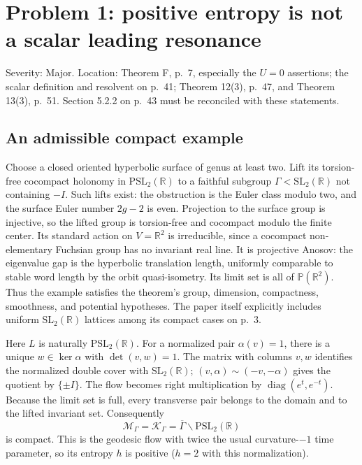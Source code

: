 \documentclass[10pt]{article}
\begin{document}
\section*{Problem 1: positive entropy is not a scalar leading resonance}
Severity: Major. Location: Theorem F, p. 7, especially the \(U=0\) assertions; the scalar definition and resolvent on p. 41; Theorem 12(3), p. 47, and Theorem 13(3), p. 51. Section 5.2.2 on p. 43 must be reconciled with these statements.\par
\subsection*{An admissible compact example}
Choose a closed oriented hyperbolic surface of genus at least two. Lift its torsion-free cocompact holonomy in \(\mathrm{PSL}_2(\mathbb R)\) to a faithful subgroup \(\Gamma<\mathrm{SL}_2(\mathbb R)\) not containing \(-I\). Such lifts exist: the obstruction is the Euler class modulo two, and the surface Euler number \(2g-2\) is even. Projection to the surface group is injective, so the lifted group is torsion-free and cocompact modulo the finite center. Its standard action on \(V=\mathbb R^2\) is irreducible, since a cocompact non-elementary Fuchsian group has no invariant real line. It is projective Anosov: the eigenvalue gap is the hyperbolic translation length, uniformly comparable to stable word length by the orbit quasi-isometry. Its limit set is all of \(\mathbb P(\mathbb R^2)\). Thus the example satisfies the theorem’s group, dimension, compactness, smoothness, and potential hypotheses. The paper itself explicitly includes uniform \(\mathrm{SL}_2(\mathbb R)\) lattices among its compact cases on p. 3.\par
Here \(L\) is naturally \(\mathrm{PSL}_2(\mathbb R)\). For a normalized pair \(\alpha(v)=1\), there is a unique \(w\in\ker\alpha\) with \(\det(v,w)=1\). The matrix with columns \(v,w\) identifies the normalized double cover with \(\mathrm{SL}_2(\mathbb R)\); \((v,\alpha)\sim(-v,-\alpha)\) gives the quotient by \(\{\pm I\}\). The flow becomes right multiplication by \(\operatorname{diag}(e^t,e^{-t})\). Because the limit set is full, every transverse pair belongs to the domain and to the lifted invariant set. Consequently \[\mathcal M_\Gamma=\mathcal K_\Gamma
 =\overline\Gamma\backslash\mathrm{PSL}_2(\mathbb R)\] is compact. This is the geodesic flow with twice the usual curvature-\(-1\) time parameter, so its entropy \(h\) is positive (\(h=2\) with this normalization).\par
\end{document}

